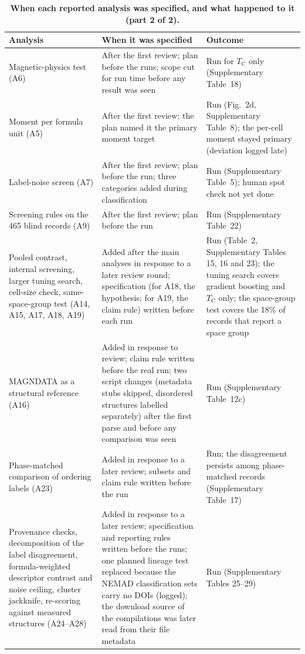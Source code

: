 \documentclass[pdflatex,sn-nature]{sn-jnl}
\newcommand{\Tc}{\ensuremath{T_\mathrm{C}}}
\begin{document}
\begin{table}[!ht]
\caption{\textbf{When each reported analysis was specified, and what happened to it (part 2 of 2).}}\label{tab:s14}%
\setlength{\tabcolsep}{3pt}%
\begin{tabular}{@{}>{\raggedright\arraybackslash}p{88pt}>{\raggedright\arraybackslash}p{150pt}>{\raggedright\arraybackslash}p{116pt}@{}}
\toprule
Analysis & When it was specified & Outcome \\
\midrule
Magnetic-physics test (A6) & After the first review; plan before the runs; scope cut for run time before any result was seen & Run for \Tc{} only (Supplementary Table~18) \\
Moment per formula unit (A5) & After the first review; the plan named it the primary moment target & Run (Fig.~2d, Supplementary Table~8); the per-cell moment stayed primary (deviation logged late) \\
Label-noise screen (A7) & After the first review; plan before the run; three categories added during classification & Run (Supplementary Table~5); human spot check not yet done \\
Screening rules on the 465 blind records (A9) & After the first review; plan before the run & Run (Supplementary Table~22) \\
Pooled contrast, internal screening, larger tuning search, cell-size check, same-space-group test (A14, A15, A17, A18, A19) & Added after the main analyses in response to a later review round; specification (for A18, the hypothesis; for A19, the claim rule) written before each run & Run (Table~2, Supplementary Tables 15, 16 and 23); the tuning search covers gradient boosting and \Tc{} only; the space-group test covers the 18\% of records that report a space group \\
MAGNDATA as a structural reference (A16) & Added in response to review; claim rule written before the real run; two script changes (metadata stubs skipped, disordered structures labelled separately) after the first parse and before any comparison was seen & Run (Supplementary Table~12c) \\
Phase-matched comparison of ordering labels (A23) & Added in response to a later review; subsets and claim rule written before the run & Run; the disagreement persists among phase-matched records (Supplementary Table~17) \\
Provenance checks, decomposition of the label disagreement, formula-weighted descriptor contrast and noise ceiling, cluster jackknife, re-scoring against measured structures (A24--A28) & Added in response to a later review; specification and reporting rules written before the runs; one planned lineage test replaced because the NEMAD classification sets carry no DOIs (logged); the download source of the compilations was later read from their file metadata & Run (Supplementary Tables 25--29) \\

\end{tabular}
\end{table}
\end{document}
